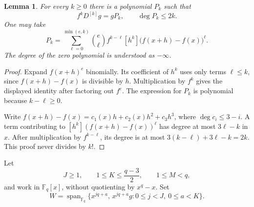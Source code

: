 \documentclass[11pt]{amsart}
\newtheorem{lemma}[theorem]{Lemma}
\theoremstyle{definition}
\theoremstyle{remark}
\newcommand{\F}{\mathbb F}
\newcommand{\HD}[1]{D^{[#1]}}
\newcommand{\Span}{\operatorname{span}}
\begin{document}
\begin{lemma}\label{lem:Pk}
For every $k\ge0$ there is a polynomial $P_k$ such that
\[
f^k\HD{k}g=gP_k,\qquad \deg P_k\le2k.
\]
One may take
\[
P_k=\sum_{\ell=0}^{\min(e,k)}
 \binom e\ell f^{k-\ell}
 [h^k]\bigl(f(x+h)-f(x)\bigr)^\ell.
\]
The degree of the zero polynomial is understood as $-\infty$.
\end{lemma}
\begin{proof}
Expand $f(x+h)^e$ binomially. Its coefficient of $h^k$ uses only terms $\ell\le k$, since $f(x+h)-f(x)$ is divisible by $h$. Multiplication by $f^k$ gives the displayed identity after factoring out $f^e$. The expression for $P_k$ is polynomial because $k-\ell\ge0$.

Write $f(x+h)-f(x)=c_1(x)h+c_2(x)h^2+c_3h^3$, where $\deg c_i\le3-i$. A term contributing to $[h^k](f(x+h)-f(x))^\ell$ has degree at most $3\ell-k$ in $x$. After multiplication by $f^{k-\ell}$, its degree is at most $3(k-\ell)+3\ell-k=2k$. This proof never divides by $k!$.
\end{proof}

Let
\[
J\ge1,\qquad 1\le K\le\frac{q-3}{2},\qquad 1\le M<q,
\]
and work in $\F_q[x]$, without quotienting by $x^q-x$. Set
\[
W=\Span_{\F_q}\{x^{jq+a},\,x^{jq+a}g:
                  0\le j<J,\ 0\le a<K\}.
\]
\end{document}
